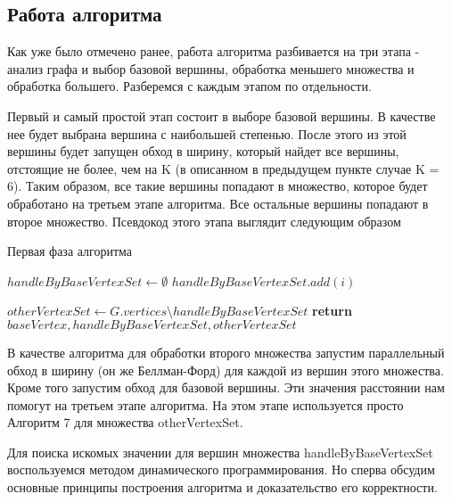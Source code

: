 \FloatBarrier
\subsection{Работа алгоритма}
Как уже было отмечено ранее, работа алгоритма разбивается на три этапа - анализ графа и выбор базовой вершины, обработка меньшего множества и обработка большего. Разберемся с каждым этапом по отдельности.

Первый и самый простой этап состоит в выборе базовой вершины. В качестве нее будет выбрана вершина с наибольшей степенью. После этого из этой вершины будет запущен обход в ширину, который найдет все вершины, отстоящие не более, чем на K (в описанном в предыдущем пункте случае K = 6). Таким образом, все такие вершины попадают в множество, которое будет обработано на третьем этапе алгоритма. Все остальные вершины попадают в второе множество. Псевдокод этого этапа выглядит следующим образом

\FloatBarrier
\begin{algorithm}
\caption{Первая фаза алгоритма}\label{all_pairs_social1}
\begin{algorithmic}[1]
\State $handleByBaseVertexSet \gets \emptyset$
\algrenewcommand{} 
\algrenewcommand{}
		\State $handleByBaseVertexSet.add(i)$
	\EndIf
\EndFor

\State $otherVertexSet \gets G.vertices \setminus handleByBaseVertexSet$ 
\State \textbf{return} $ baseVertex, handleByBaseVertexSet, otherVertexSet$
\EndProcedure

\end{algorithmic}
\end{algorithm}




В качестве алгоритма для обработки второго множества запустим параллельный обход в ширину (он же Беллман-Форд) для каждой из вершин этого множества. Кроме того запустим обход для базовой вершины. Эти значения расстоянии нам помогут на третьем этапе алгоритма. На этом этапе используется просто Алгоритм 7 для множества otherVertexSet. 

Для поиска искомых значении для вершин множества handleByBaseVertexSet воспользуемся методом динамического программирования. Но сперва обсудим основные принципы построения алгоритма и доказательство его корректности. 

